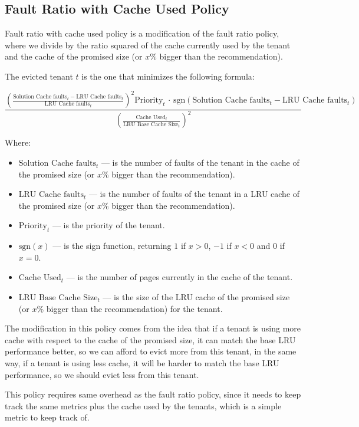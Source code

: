 \subsection{Fault Ratio with Cache Used Policy}

Fault ratio with cache used policy is a modification of the fault ratio policy, where we
divide by the ratio squared of the cache currently used by the tenant and the cache of the
promised size (or $x\%$ bigger than the recommendation).

The evicted tenant $t$ is the one that minimizes the following formula:

$$
\frac{ \left( \frac{\text{Solution Cache faults}_t - \text{LRU Cache faults}_t}{\text{LRU Cache faults}_t} \right) ^2 \text{Priority}_t \, \cdot \, \text{sgn}( \text{Solution Cache faults}_t - \text{LRU Cache faults}_t ) }{ \left( \frac{\text{Cache Used}_t}{\text{LRU Base Cache Size}_t} \right) ^2 }
$$

Where:

\begin{itemize}
    \item $\text{Solution Cache faults}_t$ --- is the number of faults of the tenant in the cache of the promised size (or $x\%$ bigger than the recommendation).
    \item $\text{LRU Cache faults}_t$ --- is the number of faults of the tenant in a LRU cache of the promised size (or $x\%$ bigger than the recommendation).
    \item $\text{Priority}_t$ --- is the priority of the tenant.
    \item $\text{sgn}(x)$ --- is the sign function, returning $1$ if $x > 0$, $-1$ if $x < 0$ and $0$ if $x = 0$.
    \item $\text{Cache Used}_t$ --- is the number of pages currently in the cache of the tenant.
    \item $\text{LRU Base Cache Size}_t$ --- is the size of the LRU cache of the promised size (or $x\%$ bigger than the recommendation) for the tenant.
\end{itemize}

The modification in this policy comes from the idea that if a tenant is using more cache
with respect to the cache of the promised size, it can match the base LRU performance 
better, so we can afford to evict more from this tenant, in the same way, if a tenant is
using less cache, it will be harder to match the base LRU performance, so we should evict
less from this tenant.

This policy requires same overhead as the fault ratio policy, since it needs to keep track
the same metrics plus the cache used by the tenants, which is a simple metric to keep track
of.

